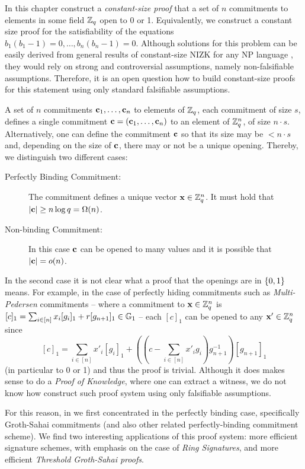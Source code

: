 In this chapter construct a \emph{constant-size proof} that a set of $n$ commitments to elements in some field $\mathbb{Z}_q$ open to 0 or 1. Equivalently, we construct a constant size proof for the satisfiability of the equations $b_1(b_1-1)=0,\ldots,b_n(b_n-1)=0$.
Although solutions for this problem can be easily derived from general results of constant-size NIZK for any NP language \cite{EC:GGPR13,AC:DFGK14,EC:Groth16}, they would rely on strong and controversial assumptions, namely non-falsifiable assumptions. Therefore, it is an open question how to build constant-size proofs for this statement using only standard falsifiable assumptions. 

A set of $n$ commitments $\mathbf{c}_1,\ldots,\mathbf{c}_n$ to elements of $\mathbb{Z}_q$, each commitment of size $s$, defines a single commitment $\mathbf{c}=(\mathbf{c}_1,\ldots,\mathbf{c}_n)$ to an element of $\mathbb{Z}_q^n$, of size $n\cdot s$. Alternatively, one can define the commitment $\mathbf{c}$ so that its size may be $<n\cdot s$ and, depending on the size of $\mathbf{c}$, there may or not be a unique opening. Thereby, we distinguish two different cases:

\begin{description}
\item[Perfectly Binding Commitment:] The commitment defines a unique vector $\mathbf{x}\in\mathbb{Z}_q^n$. It must hold that $|\mathbf{c}|\geq n\log q = \Omega(n)$.
\item[Non-binding Commitment:] In this case $\mathbf{c}$ can be opened to many values and it is possible that $|\mathbf{c}|= o(n)$.
\end{description}

In the second case it is not clear what a proof that the openings are in $\{0,1\}$ means. For example, in the case of perfectly hiding commitments such as \emph{Multi-Pedersen} commitments -- where a commitment to $\mathbf{x}\in\mathbb{Z}_q^n$ is $[c]_1=\sum_{i\in[n]}x_i[g_i]_1+r[g_{n+1}]_1\in\mathbb{G}_1$ -- each $[c]_1$ can be opened to any $\mathbf{x}'\in\mathbb{Z}_q^n$ since
$$[c]_1=\sum_{i\in[n]}x'_i[g_i]_1+\left(\left(c-\sum_{i\in[n]}x'_ig_i\right)g_{n+1}^{-1}\right)[g_{n+1}]_1$$
(in particular to 0 or 1) and thus the proof is trivial. Although it does makes sense to do a \emph{Proof of Knowledge}, where one can extract a witness, we do not know how construct such proof system using only falsifiable assumptions.

For this reason, in \cite{AC:GonHevRaf15} we first concentrated in the perfectly binding case, specifically Groth-Sahai commitments (and also other related perfectly-binding commitment scheme). We find two interesting applications of this proof system: more efficient signature schemes, with emphasis on the case of \emph{Ring Signatures}, and more efficient \emph{Threshold Groth-Sahai proofs}.
 
